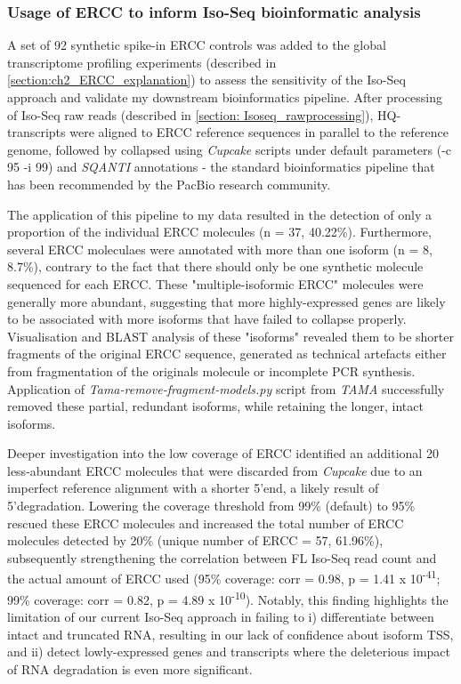 \subsubsection{Usage of ERCC to inform Iso-Seq bioinformatic analysis}
A set of 92 synthetic spike-in ERCC controls was added to the global transcriptome profiling experiments (described in \cref{section:ch2_ERCC_explanation}) to assess the sensitivity of the Iso-Seq approach and validate my downstream bioinformatics pipeline. After processing of Iso-Seq raw reads (described in \cref{section: Isoseq_rawprocessing}), HQ-transcripts were aligned to ERCC reference sequences in parallel to the reference genome, followed by collapsed using \textit{Cupcake} scripts under default parameters (-c 95 -i 99) and \textit{SQANTI} annotations - the standard bioinformatics pipeline that has been recommended by the PacBio research community. 

The application of this pipeline to my data resulted in the detection of only a proportion of the individual ERCC molecules (n = 37, 40.22\%). Furthermore, several ERCC moleculaes were annotated with more than one isoform (n = 8, 8.7\%), contrary to the fact that there should only be one synthetic molecule sequenced for each ERCC. These "multiple-isoformic ERCC" molecules were generally more abundant, suggesting that more highly-expressed genes are likely to be associated with more isoforms that have failed to collapse properly. Visualisation and BLAST analysis of these "isoforms" revealed them to be shorter fragments of the original ERCC sequence, generated as technical artefacts either from fragmentation of the originals molecule or incomplete PCR synthesis. Application of \textit{Tama-remove-fragment-models.py} script from \textit{TAMA}\cite{Kuo2017} successfully removed these partial, redundant isoforms, while retaining the longer, intact isoforms. 

Deeper investigation into the low coverage of ERCC identified an additional 20 less-abundant ERCC molecules that were 
discarded from \textit{Cupcake} due to an imperfect reference alignment with a shorter 5'end, a likely result of 5'degradation. Lowering the coverage threshold from 99\% (default) to 95\% rescued these ERCC molecules and increased the total number of ERCC molecules detected by 20\% (unique number of ERCC = 57, 61.96\%), subsequently strengthening the correlation between FL Iso-Seq read count and the actual amount of ERCC used (95\% coverage: corr = 0.98, p = 1.41 x 10\textsuperscript{-41}; 99\% coverage: corr = 0.82, p = 4.89 x 10\textsuperscript{-10}). Notably, this finding highlights the limitation of our current Iso-Seq approach in failing to i) differentiate between intact and truncated RNA, resulting in our lack of confidence about isoform TSS, and ii) detect lowly-expressed genes and transcripts where the deleterious impact of RNA degradation is even more significant. 
